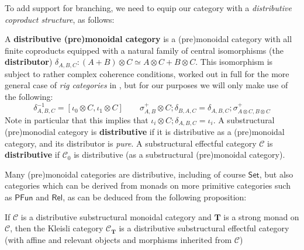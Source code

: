 \documentclass[acmsmall,screen,review]{acmart}
\newcommand{\mc}[1]{\ensuremath{\mathcal{#1}}}
\newcommand{\mb}[1]{\ensuremath{\mathbf{#1}}}
\newcommand{\ms}[1]{\ensuremath{\mathsf{#1}}}
\begin{document}
To add support for branching, we need to equip our category with a
\textit{distributive coproduct structure}, as follows:
\begin{definition} 
  A \textbf{distributive (pre)monoidal category} is a (pre)monoidal category
  with all finite coproducts equipped with a natural family of central
  isomorphisms (the \textbf{distributor}) \(\delta_{A, B, C}: (A + B) \otimes C
  \simeq A \otimes C + B \otimes C\). This isomorphism is subject to rather
  complex coherence conditions, worked out in full for the more general case of
  \textit{rig categories} in \cite{laplaza-distributivity}, but for our purposes
  we will only make use of the following:
  \begin{equation*}
    \delta_{A, B, C}^{-1} = [\iota_0 \otimes C, \iota_1 \otimes C] 
    \qquad
    \sigma^+_{A, B} \otimes C;\delta_{B, A, C} = \delta_{A, B, C};\sigma^+_{A \otimes C, B \otimes C}
  \end{equation*}
  Note in particular that this implies that \(\iota_i \otimes C;\delta_{A, B, C}
  = \iota_i\). A substructural (pre)monodial category is \textbf{distributive}
  if it is distributive as a (pre)monoidal category, and its distributor is
  \textit{pure}. A substructural effectful category \(\mc{C}\) is
  \textbf{distributive} if \(\mc{C}_0\) is distributive (as a substructural
  (pre)monoidal category).
\end{definition}
Many (pre)monoidal categories are distributive, including of course
\(\ms{Set}\), but also categories which can be derived from monads on more
primitive categories such as \(\ms{PFun}\) and \(\ms{Rel}\), as can be deduced
from the following proposition:
\begin{proposition}
  If \(\mc{C}\) is a distributive substructural monoidal category and \(\mb{T}\)
  is a strong monad on \(\mc{C}\), then the Kleisli category \(\mc{C}_{\mb{T}}\)
  is a distributive substructural effectful category (with affine and relevant
  objects and morphisms inherited from \(\mc{C}\))
\end{proposition}
\end{document}
